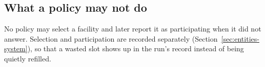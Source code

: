 \subsection{What a policy may not do}
No policy may select a facility and later report it as participating when it did not
answer. Selection and participation are recorded separately
(Section~\ref{sec:entities-system}), so that a wasted slot shows up in the run's record instead
of being quietly refilled.
